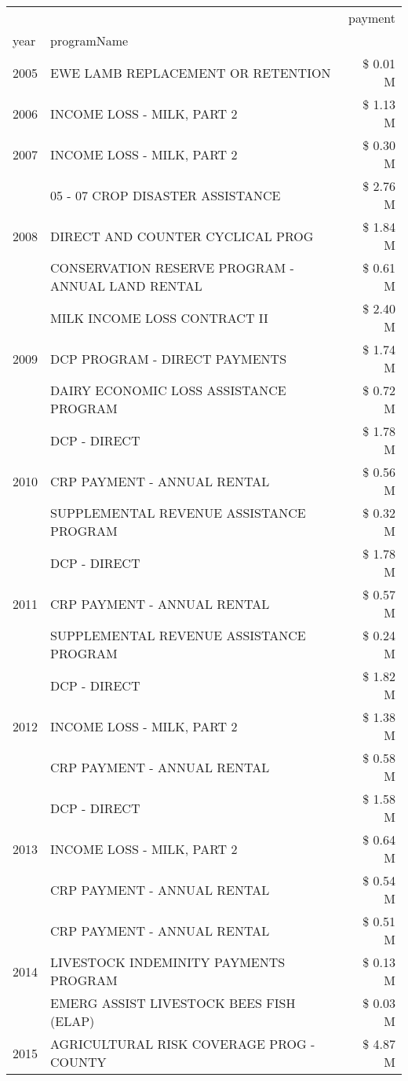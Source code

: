 \begin{tabular}{llr}
\toprule
 &  & payment \\
year & programName &  \\
\midrule
2005 & EWE LAMB REPLACEMENT OR RETENTION & \$ 0.01 M \\
\cline{1-3}
2006 & INCOME LOSS - MILK, PART 2 & \$ 1.13 M \\
\cline{1-3}
2007 & INCOME LOSS - MILK, PART 2 & \$ 0.30 M \\
\cline{1-3}
\multirow[t]{3}{*}{2008} & 05 - 07 CROP DISASTER ASSISTANCE & \$ 2.76 M \\
 & DIRECT AND COUNTER CYCLICAL PROG & \$ 1.84 M \\
 & CONSERVATION RESERVE PROGRAM - ANNUAL LAND RENTAL & \$ 0.61 M \\
\cline{1-3}
\multirow[t]{3}{*}{2009} & MILK INCOME LOSS CONTRACT II & \$ 2.40 M \\
 & DCP PROGRAM - DIRECT PAYMENTS & \$ 1.74 M \\
 & DAIRY ECONOMIC LOSS ASSISTANCE PROGRAM & \$ 0.72 M \\
\cline{1-3}
\multirow[t]{3}{*}{2010} & DCP - DIRECT & \$ 1.78 M \\
 & CRP PAYMENT - ANNUAL RENTAL & \$ 0.56 M \\
 & SUPPLEMENTAL REVENUE ASSISTANCE PROGRAM & \$ 0.32 M \\
\cline{1-3}
\multirow[t]{3}{*}{2011} & DCP - DIRECT & \$ 1.78 M \\
 & CRP PAYMENT - ANNUAL RENTAL & \$ 0.57 M \\
 & SUPPLEMENTAL REVENUE ASSISTANCE PROGRAM & \$ 0.24 M \\
\cline{1-3}
\multirow[t]{3}{*}{2012} & DCP - DIRECT & \$ 1.82 M \\
 & INCOME LOSS - MILK, PART 2 & \$ 1.38 M \\
 & CRP PAYMENT - ANNUAL RENTAL & \$ 0.58 M \\
\cline{1-3}
\multirow[t]{3}{*}{2013} & DCP - DIRECT & \$ 1.58 M \\
 & INCOME LOSS - MILK, PART 2 & \$ 0.64 M \\
 & CRP PAYMENT - ANNUAL RENTAL & \$ 0.54 M \\
\cline{1-3}
\multirow[t]{3}{*}{2014} & CRP PAYMENT - ANNUAL RENTAL & \$ 0.51 M \\
 & LIVESTOCK INDEMINITY PAYMENTS PROGRAM & \$ 0.13 M \\
 & EMERG ASSIST LIVESTOCK BEES FISH (ELAP) & \$ 0.03 M \\
\cline{1-3}
\multirow[t]{3}{*}{2015} & AGRICULTURAL RISK COVERAGE PROG - COUNTY & \$ 4.87 M \\

\end{tabular}
